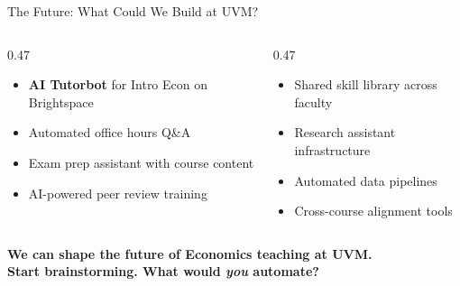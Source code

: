 \documentclass[aspectratio=169, 10pt]{beamer}
\begin{document}
\begin{frame}{The Future: What Could We Build at UVM?}
\begin{columns}[T]
\begin{column}{0.47\textwidth}
\begin{tcolorbox}[keybox, title={\faGraduationCap\quad Teaching}]
\scriptsize
\begin{itemize}\setlength{\itemsep}{1pt}
  \item \textbf{AI Tutorbot} for Intro Econ on Brightspace
  \item Automated office hours Q\&A
  \item Exam prep assistant with course content
  \item AI-powered peer review training
\end{itemize}
\end{tcolorbox}
\end{column}
\begin{column}{0.47\textwidth}
\begin{tcolorbox}[keybox, title={\faUniversity\quad Department-Wide}]
\scriptsize
\begin{itemize}\setlength{\itemsep}{1pt}
  \item Shared skill library across faculty
  \item Research assistant infrastructure
  \item Automated data pipelines
  \item Cross-course alignment tools
\end{itemize}
\end{tcolorbox}
\end{column}
\end{columns}
\vskip6pt
\pause
\begin{tcolorbox}[accentbox, halign=center, width=11cm, top=3pt, bottom=3pt]
\small\bfseries We can shape the future of Economics teaching at UVM.\\[1pt]
\normalfont\scriptsize Start brainstorming. What would \textit{you} automate?
\end{tcolorbox}
\end{frame}
\end{document}
